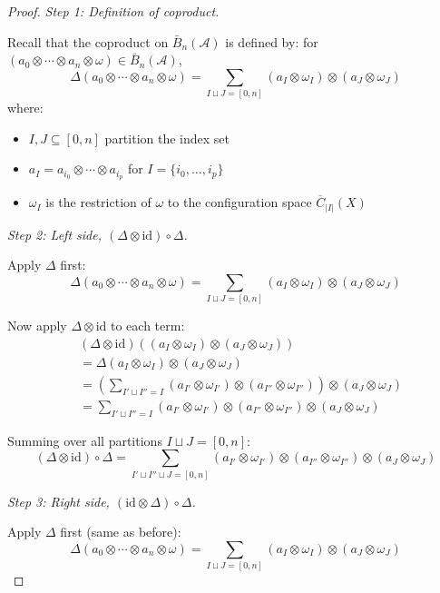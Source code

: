 \begin{proof}

\smallskip\noindent\emph{Step 1: Definition of coproduct.}

Recall that the coproduct on $\bar{B}_n(\mathcal{A})$ is defined by: for $(a_0 \otimes \cdots \otimes a_n \otimes \omega) \in \bar{B}_n(\mathcal{A})$,
\[\Delta(a_0 \otimes \cdots \otimes a_n \otimes \omega) = \sum_{I \sqcup J = [0,n]} (a_I \otimes \omega_I) \otimes (a_J \otimes \omega_J)\]
where:
\begin{itemize}
\item $I, J \subseteq [0,n]$ partition the index set
\item $a_I = a_{i_0} \otimes \cdots \otimes a_{i_p}$ for $I = \{i_0, \ldots, i_p\}$
\item $\omega_I$ is the restriction of $\omega$ to the configuration space $\overline{C}_{|I|}(X)$
\end{itemize}

\smallskip\noindent\emph{Step 2: Left side, $(\Delta \otimes \mathrm{id}) \circ \Delta$.}

Apply $\Delta$ first:
\[\Delta(a_0 \otimes \cdots \otimes a_n \otimes \omega) = \sum_{I \sqcup J = [0,n]} (a_I \otimes \omega_I) \otimes (a_J \otimes \omega_J)\]

Now apply $\Delta \otimes \text{id}$ to each term:
\begin{align*}
&(\Delta \otimes \text{id})\left((a_I \otimes \omega_I) \otimes (a_J \otimes \omega_J)\right) \\
&= \Delta(a_I \otimes \omega_I) \otimes (a_J \otimes \omega_J) \\
&= \left(\sum_{I' \sqcup I'' = I} (a_{I'} \otimes \omega_{I'}) \otimes (a_{I''} \otimes \omega_{I''})\right) \otimes (a_J \otimes \omega_J) \\
&= \sum_{I' \sqcup I'' = I} (a_{I'} \otimes \omega_{I'}) \otimes (a_{I''} \otimes \omega_{I''}) \otimes (a_J \otimes \omega_J)
\end{align*}

Summing over all partitions $I \sqcup J = [0,n]$:
\[(\Delta \otimes \text{id}) \circ \Delta = \sum_{I' \sqcup I'' \sqcup J = [0,n]} (a_{I'} \otimes \omega_{I'}) \otimes (a_{I''} \otimes \omega_{I''}) \otimes (a_J \otimes \omega_J)\]

\smallskip\noindent\emph{Step 3: Right side, $(\mathrm{id} \otimes \Delta) \circ \Delta$.}

Apply $\Delta$ first (same as before):
\[\Delta(a_0 \otimes \cdots \otimes a_n \otimes \omega) = \sum_{I \sqcup J = [0,n]} (a_I \otimes \omega_I) \otimes (a_J \otimes \omega_J)\]


\end{proof}
